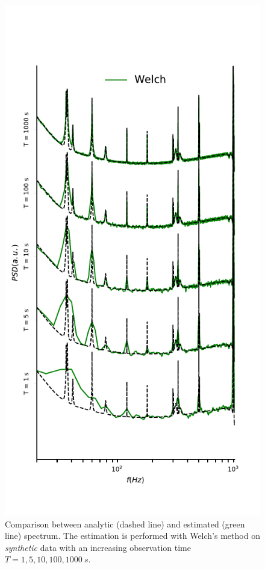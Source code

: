 \documentclass{aa}
\begin{document}
\begin{figure}
\begin{minipage}{0.99\columnwidth}
\end{minipage}\hfill
\begin{minipage}{0.99\columnwidth}
	\caption{Comparison between analytic (dashed line) and estimated (green line) spectrum. The estimation is performed with Welch's method on \textit{synthetic} data with an increasing observation time $T = 1, 5, 10, 100, \SI{1000}{s}$.}
	\label{fig:welch_LIGO_data}
	\includegraphics{Images/comparison_LVC_data/comparison_LVC_data_Welch.pdf}
\end{minipage}

\end{figure}
\end{document}
